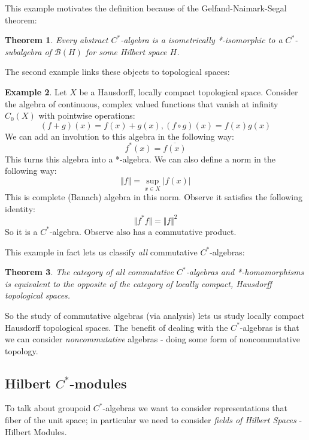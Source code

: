 \documentclass[11pt,]{amsbook}
\theoremstyle{plain}
\newtheorem{theorem}{Theorem}%
\theoremstyle{definition}%
\newtheorem{example}[theorem]{Example}%
\theoremstyle{remark}%
\begin{document}
This example motivates the definition because of the Gelfand-Naimark-Segal theorem:

\begin{theorem}
Every abstract $C^{*}$-algebra is a isometrically *-isomorphic to a $C^{*}$-subalgebra of $\mathcal{B}(H)$ for some Hilbert space $H$.
\end{theorem}

The second example links these objects to topological spaces:

\begin{example}
Let $X$ be a Hausdorff, locally compact topological space. Consider the algebra of continuous, complex valued functions that vanish at infinity $C_{0}(X)$ with pointwise operations:
\begin{equation*}
(f+g)(x)=f(x)+g(x), (f\circ g)(x)=f(x)g(x)
\end{equation*}
We can add an involution to this algebra in the following way:
\begin{equation*}
f^{*}(x)=\overline{f(x)}
\end{equation*}
This turns this algebra into a *-algebra. We can also define a norm in the following way:
\begin{equation*}
\Vert f \Vert = \sup_{x \in X} \vert f(x) \vert
\end{equation*}
This is complete (Banach) algebra in this norm. Observe it satisfies the following identity:
\begin{equation*}
\Vert f^{*}f \Vert = \Vert f \Vert^{2}
\end{equation*}
So it is a $C^{*}$-algebra. Observe also has a commutative product.
\end{example}

This example in fact lets us classify \textit{all} commutative $C^{*}$-algebras:

\begin{theorem}
The category of all commutative $C^{*}$-algebras and *-homomorphisms is equivalent to the opposite of the category of locally compact, Hausdorff topological spaces.
\end{theorem}

So the study of commutative algebras (via analysis) lets us study locally compact Hausdorff topological spaces. The benefit of dealing with the $C^{*}$-algebras is that we can consider \textit{noncommutative} algebras - doing some form of noncommutative topology.

\subsection{Hilbert $C^{*}$-modules}
To talk about groupoid $C^{*}$-algebras we want to consider representations that fiber of the unit space; in particular we need to consider \textit{fields of Hilbert Spaces} - Hilbert Modules.
\end{document}
